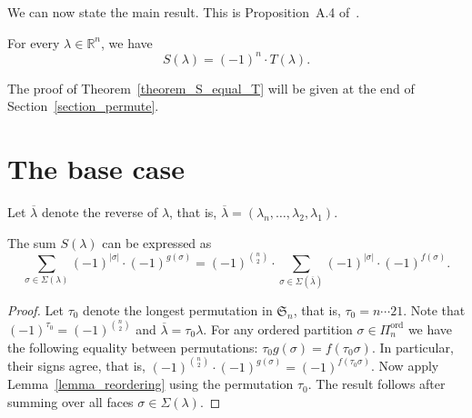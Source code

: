 \documentclass[ALCO,ThmDefs,Unicode,epreuves]{cedram}
\newcommand{\Rrr}{\mathbb{R}}
\newcommand{\Sym}{\mathfrak{S}}
\DeclareMathOperator{\ord}{ord}
\newcommand{\Qn}{\Pi^{\ord}_{n}}
\begin{document}
We can now state the main result.
This
is Proposition~A.4 of~\cite{Morel}.
\begin{theorem}
For every $\lambda \in \Rrr^{n}$, we have
\[S(\lambda)=(-1)^{n} \cdot T(\lambda) . \]
\label{theorem_S_equal_T}
\end{theorem}
The proof of Theorem~\ref{theorem_S_equal_T} will
be given
at the end of Section~\ref{section_permute}.

\section{The base case}
\label{section_base_case}

Let $\overline{\lambda}$ denote the
reverse of $\lambda$, that is,
$\overline{\lambda} = (\lambda_{n}, \ldots, \lambda_{2}, \lambda_{1})$.
\begin{lemma}
The sum $S(\lambda)$ can be expressed as
$$
\sum_{\sigma \in \Sigma(\lambda)}
(-1)^{|\sigma|} \cdot (-1)^{g(\sigma)} 
=
(-1)^{\binom{n}{2}}
\cdot
\sum_{\sigma \in \Sigma(\overline{\lambda})}
(-1)^{|\sigma|} \cdot (-1)^{f(\sigma)} . 
$$
\label{lemma_reverse}
\end{lemma}
\begin{proof}
Let $\tau_{0}$ denote the longest permutation
in $\Sym_{n}$,
that is,
$\tau_{0} = n \cdots 21$.
Note that $(-1)^{\tau_{0}} = (-1)^{\binom{n}{2}}$
and $\overline{\lambda} = \tau_{0} \lambda$.
For any ordered partition $\sigma \in \Qn$ 
we have the
following equality between permutations:
$\tau_{0} g(\sigma) = f(\tau_{0} \sigma)$.
In particular, their signs agree, that is,
$(-1)^{\binom{n}{2}} \cdot (-1)^{g(\sigma)}
= 
(-1)^{f(\tau_{0} \sigma)}$.
Now apply Lemma~\ref{lemma_reordering}
using the permutation $\tau_{0}$.
The result follows after summing over all faces
$\sigma \in \Sigma(\lambda)$.
\end{proof}
\end{document}
